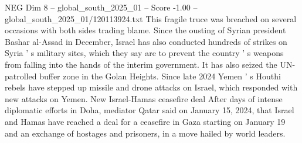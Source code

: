 \begin{textsample}{NEG Dim 8 – global\_south\_2025\_01 – Score -1.00 – global\_south\_2025\_01/120113924.txt}
This fragile truce was breached on several occasions with both sides trading blame.
Since the ousting of Syrian president Bashar al-Assad in December, Israel has also conducted hundreds of strikes on Syria ' s military sites, which they say are to prevent the country ' s weapons from falling into the hands of the interim government.
It has also seized the UN-patrolled buffer zone in the Golan Heights.
Since late 2024 Yemen ' s Houthi rebels have stepped up missile and drone attacks on Israel, which responded with new attacks on Yemen.
New Israel-Hamas ceasefire deal After days of intense diplomatic efforts in Doha, mediator Qatar said on January 15, 2024, that Israel and Hamas have reached a deal for a ceasefire in Gaza starting on January 19 and an exchange of hostages and prisoners, in a move hailed by world leaders.

\end{textsample}
